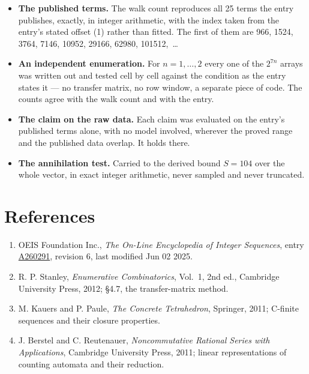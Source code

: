 \documentclass[11pt]{article}
\theoremstyle{definition}
\begin{document}
\begin{itemize}

\item {\bfseries The published terms.} The walk count reproduces all 25 terms the entry publishes, exactly, in integer arithmetic, with the index taken from the entry's stated offset (1) rather than fitted. The first of them are 966, 1524, 3764, 7146, 10952, 29166, 62980, 101512,~\dots

\item {\bfseries An independent enumeration.} For $n = 1,\dots,2$ every one of the $2^{7n}$ arrays was written out and tested cell by cell against the condition as the entry states it --- no transfer matrix, no row window, a separate piece of code. The counts agree with the walk count and with the entry.

\item {\bfseries The claim on the raw data.} Each claim was evaluated on the entry's published terms alone, with no model involved, wherever the proved range and the published data overlap. It holds there.

\item {\bfseries The annihilation test.} Carried to the derived bound $S = 104$ over the whole vector, in exact integer arithmetic, never sampled and never truncated.

\end{itemize}

\section{References}

\begin{enumerate}

\item OEIS Foundation Inc., \emph{The On-Line Encyclopedia of Integer Sequences}, entry \href{https://oeis.org/A260291}{A260291}, revision 6, last modified Jun 02 2025.

\item R. P. Stanley, \emph{Enumerative Combinatorics}, Vol.~1, 2nd ed., Cambridge University Press, 2012; \S4.7, the transfer-matrix method.

\item M. Kauers and P. Paule, \emph{The Concrete Tetrahedron}, Springer, 2011; C-finite sequences and their closure properties.

\item J. Berstel and C. Reutenauer, \emph{Noncommutative Rational Series with Applications}, Cambridge University Press, 2011; linear representations of counting automata and their reduction.

\end{enumerate}
\end{document}
